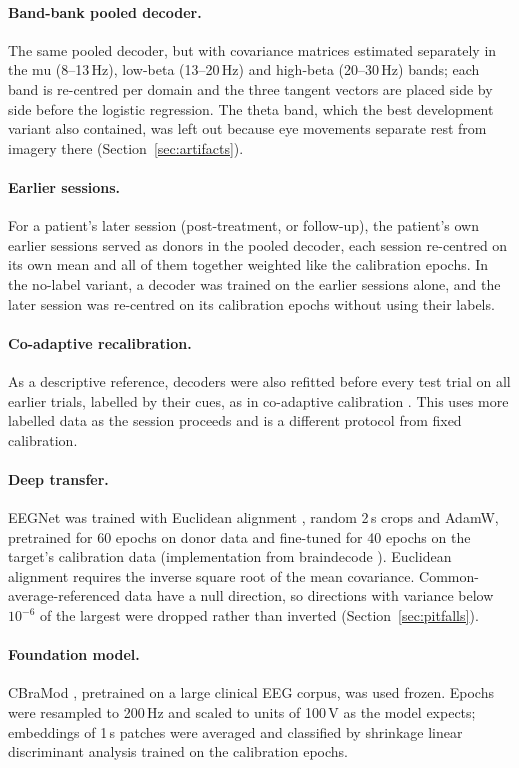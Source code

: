 \documentclass[11pt]{article}
\begin{document}
\paragraph{Band-bank pooled decoder.} The same pooled decoder, but with covariance matrices estimated separately in the mu (8--13\,Hz), low-beta (13--20\,Hz) and high-beta (20--30\,Hz) bands; each band is re-centred per domain and the three tangent vectors are placed side by side before the logistic regression. The theta band, which the best development variant also contained, was left out because eye movements separate rest from imagery there (Section~\ref{sec:artifacts}).

\paragraph{Earlier sessions.} For a patient's later session (post-treatment, or follow-up), the patient's own earlier sessions served as donors in the pooled decoder, each session re-centred on its own mean and all of them together weighted like the calibration epochs. In the no-label variant, a decoder was trained on the earlier sessions alone, and the later session was re-centred on its calibration epochs without using their labels.

\paragraph{Co-adaptive recalibration.} As a descriptive reference, decoders were also refitted before every test trial on all earlier trials, labelled by their cues, as in co-adaptive calibration \citep{vidaurre2011}. This uses more labelled data as the session proceeds and is a different protocol from fixed calibration.

\paragraph{Deep transfer.} EEGNet \citep{lawhern2018} was trained with Euclidean alignment \citep{he2020}, random 2\,s crops and AdamW, pretrained for 60 epochs on donor data and fine-tuned for 40 epochs on the target's calibration data (implementation from braindecode \citep{schirrmeister2017}). Euclidean alignment requires the inverse square root of the mean covariance. Common-average-referenced data have a null direction, so directions with variance below $10^{-6}$ of the largest were dropped rather than inverted (Section~\ref{sec:pitfalls}).

\paragraph{Foundation model.} CBraMod \citep{wang2025cbramod}, pretrained on a large clinical EEG corpus, was used frozen. Epochs were resampled to 200\,Hz and scaled to units of 100\,\textmu V as the model expects; embeddings of 1\,s patches were averaged and classified by shrinkage linear discriminant analysis trained on the calibration epochs.
\end{document}

